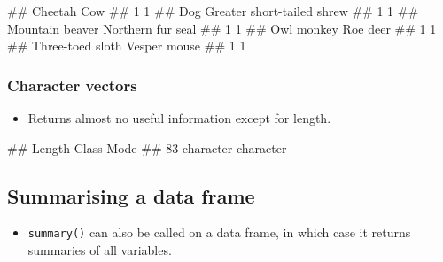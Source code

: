 \documentclass[
]{book}
\newenvironment{Shaded}{\begin{snugshade}}{\end{snugshade}}
\newcommand{\FunctionTok}[1]{\textcolor[rgb]{0.00,0.00,0.00}{#1}}
\newcommand{\NormalTok}[1]{#1}
\newcommand{\SpecialCharTok}[1]{\textcolor[rgb]{0.00,0.00,0.00}{#1}}
\providecommand{\tightlist}{%
  \setlength{\itemsep}{0pt}\setlength{\parskip}{0pt}}
\begin{document}
\begin{Shaded}
\begin{Highlighting}[]
\NormalTok{\#\#                    Cheetah                        Cow }
\NormalTok{\#\#                          1                          1 }
\NormalTok{\#\#                        Dog Greater short{-}tailed shrew }
\NormalTok{\#\#                          1                          1 }
\NormalTok{\#\#            Mountain beaver          Northern fur seal }
\NormalTok{\#\#                          1                          1 }
\NormalTok{\#\#                 Owl monkey                   Roe deer }
\NormalTok{\#\#                          1                          1 }
\NormalTok{\#\#           Three{-}toed sloth               Vesper mouse }
\NormalTok{\#\#                          1                          1}
\end{Highlighting}
\end{Shaded}

\hypertarget{character-vectors}{%
\subsubsection{Character vectors}\label{character-vectors}}

\begin{itemize}
\tightlist
\item
  Returns almost no useful information except for length.
\end{itemize}

\begin{Shaded}
\end{Shaded}

\begin{Shaded}
\begin{Highlighting}[]
\NormalTok{\#\#    Length     Class      Mode }
\NormalTok{\#\#        83 character character}
\end{Highlighting}
\end{Shaded}

\hypertarget{summarising-a-data-frame}{%
\subsection{Summarising a data frame}\label{summarising-a-data-frame}}

\begin{itemize}
\tightlist
\item
  \texttt{summary()} can also be called on a data frame, in which case it returns summaries of all variables.
\end{itemize}
\end{document}
